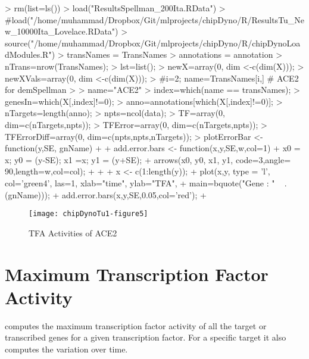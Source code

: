 \documentclass{article}
\begin{document}
\begin{Schunk}
\begin{Sinput}
> rm(list=ls())
> load("ResultsSpellman_200Ita.RData")
> #load("/home/muhammad/Dropbox/Git/mlprojects/chipDyno/R/ResultsTu_New_10000Ita_Lovelace.RData")
> source("/home/muhammad/Dropbox/Git/mlprojects/chipDyno/R/chipDynoLoadModules.R")
> transNames = TransNames
> annotations = annotation
> nTrans=nrow(TransNames);
> lst=list();
> newX=array(0, dim <-c(dim(X)));
> newXVals=array(0, dim <-c(dim(X)));
> #i=2; name=TransNames[i,] # ACE2 for demSpellman
> 
> name="ACE2"
> index=which(name == transNames);
> genesIn=which(X[,index]!=0);
> anno=annotations[which(X[,index]!=0)];
> nTargets=length(anno);
> npts=ncol(data);
> TF=array(0, dim=c(nTargets,npts));
> TFError=array(0, dim=c(nTargets,npts));
> TFErrorDiff=array(0, dim=c(npts,npts,nTargets));
> plotErrorBar <- function(y,SE, gnName){
+  
+ add.error.bars <- function(x,y,SE,w,col=1){
+  x0 = x; y0 = (y-SE); x1 =x; y1 = (y+SE);
+  arrows(x0, y0, x1, y1, code=3,angle= 90,length=w,col=col);
+  }
+  
+ x <- c(1:length(y));
+ plot(x,y, type = 'l', col='green4', las=1, xlab="time", ylab="TFA", 
+       main=bquote("Gene : " ~ .(gnName)));
+ add.error.bars(x,y,SE,0.05,col='red');
+ }
\end{Sinput}
\end{Schunk}

\begin{figure}
\begin{Schunk}
\begin{Sinput}
> M <- matrix(c(rep(1:4)), byrow=TRUE, nrow=2) # Choose the position by matrix setting!
> layout(M) 
> k <- c(17,19, 28, 50)
> #for (i in 8:11){
> for (i in k){
+ expectations = chipDynoExpectationsFast(data,X,Sigma,beta,gamma,mu, transNames, annotations, name, genesIn[i]);
+ #expectations = chipDynoExpectationsFastNoise(data,X,Sigma,beta,precs, gamma,mu, transNames, annotations, name, genesIn[i]);
+ TF[i,] = expectations[[1]];
+ TFError[i,] = expectations[[2]];
+ gnName=annotation[genesIn[i]]
+ 
+ plotErrorBar(TF[i,],TFError[i,], gnName)
+ }
\end{Sinput}
\end{Schunk}
\texttt{[image: chipDynoTu1-figure5]}
\caption{TFA Activities of ACE2}
\label{TFA_activities_ACE2}
\end{figure}

\section{Maximum Transcription Factor Activity}
 computes the maximum transcription factor activity of all the target or transcribed genes for a given transcription factor. For a specific target it also computes the variation over time.
\end{document}

